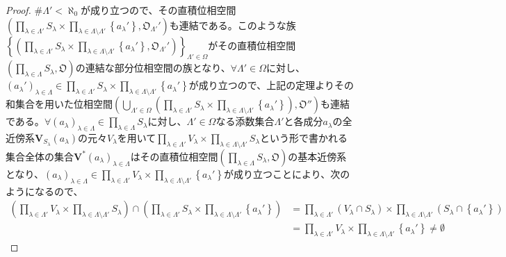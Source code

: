 \documentclass[dvipdfmx]{jsarticle}
\begin{document}
\begin{proof}
${\#}\varLambda' < \aleph_{0}$が成り立つので、その直積位相空間$\left( \prod_{\lambda \in \varLambda'} S_{\lambda} \times \prod_{\lambda \in \varLambda \setminus \varLambda'} \left\{ a_{\lambda}' \right\},\mathfrak{O}_{\varLambda'}' \right)$も連結である。このような族$\left\{ \left( \prod_{\lambda \in \varLambda'} S_{\lambda} \times \prod_{\lambda \in \varLambda \setminus \varLambda'} \left\{ a_{\lambda}' \right\},\mathfrak{O}_{\varLambda'}' \right) \right\}_{\varLambda' \in \varOmega}$がその直積位相空間$\left( \prod_{\lambda \in \varLambda} S_{\lambda},\mathfrak{O} \right)$の連結な部分位相空間の族となり、$\forall\varLambda' \in \varOmega$に対し、$\left( a_{\lambda}' \right)_{\lambda \in \varLambda} \in \prod_{\lambda \in \varLambda'} S_{\lambda} \times \prod_{\lambda \in \varLambda \setminus \varLambda'} \left\{ a_{\lambda}' \right\}$が成り立つので、上記の定理よりその和集合を用いた位相空間$\left( \bigcup_{\varLambda' \in \varOmega} \left( \prod_{\lambda \in \varLambda'} S_{\lambda} \times \prod_{\lambda \in \varLambda \setminus \varLambda'} \left\{ a_{\lambda}' \right\} \right),\mathfrak{O}'' \right)$も連結である。$\forall\left( a_{\lambda} \right)_{\lambda \in \varLambda} \in \prod_{\lambda \in \varLambda} S_{\lambda}$に対し、$\varLambda' \in \varOmega$なる添数集合$\varLambda'$と各成分$a_{\lambda}$の全近傍系$\mathbf{V}_{S_{\lambda}}\left( a_{\lambda} \right)$の元々$V_{\lambda}$を用いて$\prod_{\lambda \in \varLambda'} V_{\lambda} \times \prod_{\lambda \in \varLambda \setminus \varLambda'} S_{\lambda}$という形で書かれる集合全体の集合$\mathbf{V}^{*}\left( a_{\lambda} \right)_{\lambda \in \varLambda}$はその直積位相空間$\left( \prod_{\lambda \in \varLambda} S_{\lambda},\mathfrak{O} \right)$の基本近傍系となり、$\left( a_{\lambda} \right)_{\lambda \in \varLambda} \in \prod_{\lambda \in \varLambda'} V_{\lambda} \times \prod_{\lambda \in \varLambda \setminus \varLambda'} \left\{ a_{\lambda}' \right\}$が成り立つことにより、次のようになるので、
\begin{align*}
\left( \prod_{\lambda \in \varLambda'} V_{\lambda} \times \prod_{\lambda \in \varLambda \setminus \varLambda'} S_{\lambda} \right) \cap \left( \prod_{\lambda \in \varLambda'} S_{\lambda} \times \prod_{\lambda \in \varLambda \setminus \varLambda'} \left\{ a_{\lambda}' \right\} \right) &= \prod_{\lambda \in \varLambda'} \left( V_{\lambda} \cap S_{\lambda} \right) \times \prod_{\lambda \in \varLambda \setminus \varLambda'} \left( S_{\lambda} \cap \left\{ a_{\lambda}' \right\} \right)\\
&= \prod_{\lambda \in \varLambda'} V_{\lambda} \times \prod_{\lambda \in \varLambda \setminus \varLambda'} \left\{ a_{\lambda}' \right\} \neq \emptyset

\end{align*}
\end{proof}
\end{document}
